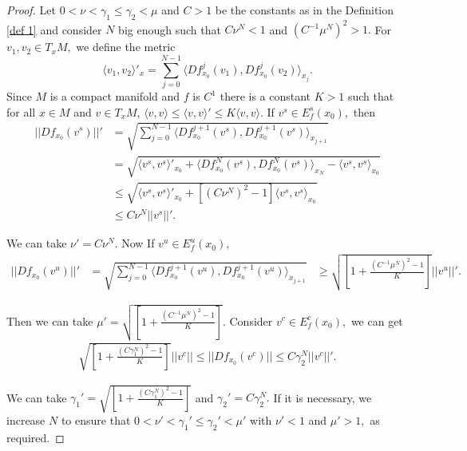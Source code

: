 \documentclass[12pt,reqno]{amsart}
\numberwithin{equation}{section}
\theoremstyle{plain}
\theoremstyle{remark}
\begin{document}
\begin{proof}
Let \mbox{$0<\nu<\gamma_1\leq \gamma_2<\mu$} and $C>1$ be the constants as in the Definition \ref{def 1} and consider $N$ big enough such that $C\nu^N< 1$ and $(C^{-1}\mu^N)^2>  1.$
For $v_1,v_2\in T_xM,$ we define the metric
$$
\langle v_1,v_2\rangle'_x=\displaystyle\sum_{j=0}^{N-1}\langle Df^j_{x_0}(v_1),Df^j_{x_0}(v_2)\rangle_{x_j}.
$$
Since $M$ is a compact manifold and $f$ is $C^1$ there is a
constant $K > 1$ such that for all $x\in M$ and $v\in T_xM$,  $\langle v,v\rangle\leq\langle v,v\rangle'\leq K\langle v,v\rangle.$ If $v^s\in E^s_f(x_0),$ then
\begin{align*}
||Df_{x_0}(v^s)||'&=\sqrt{\displaystyle\sum_{j=0}^{N-1}\langle Df^{j+1}_{x_{0}}(v^s),Df^{j+1}_{x_{0}}(v^s)\rangle_{x_{j+1}}}\\
&=\sqrt{\langle v^s,v^s\rangle'_{x_0}+\langle Df^N_{x_0}(v^s),Df^N_{x_0}(v^s)\rangle_{x_N}-\langle v^s,v^s\rangle_{x_0}}\\
&\leq\sqrt{\langle v^s,v^s\rangle'_{x_0}+[(C\nu^N)^2-1]\langle v^s,v^s\rangle_{x_0}}\\
&\leq C\nu^N ||v^s||'.
\end{align*}

We can take $\nu'= C\nu^N.$ Now  If $v^u\in E^u_f(x_0),$
\begin{align*}
||Df_{x_0}(v^u)||'&=\sqrt{\displaystyle\sum_{j=0}^{N-1}\langle Df^{j+1}_{x_{0}}(v^u),Df^{j+1}_{x_{0}}(v^u)\rangle_{x_{j+1}}} &\geq\sqrt{\left[1+\frac{(C^{-1}\mu^N)^2-1}{K}\right]}||v^u||'.
\end{align*}




Then we can take  $\mu'=\sqrt{\left[1+\frac{(C^{-1}\mu^N)^2-1}{K}\right]}.$ Consider $v^c\in E^c_f(x_0),$ we can get
\begin{align*}
\sqrt{\left[1+\frac{(C\gamma_1^N)^2-1}{K}\right]}||v^c|| \leq ||Df_{x_0}(v^c)||\leq C\gamma_2^N||v^c||'.
\end{align*}



We can take $\gamma_1'= \sqrt{\left[1+\frac{(C\gamma_1^N)^2-1}{K}\right]}$ and $\gamma_2'= C\gamma_2^N.$ If it is necessary, we increase $N$ to ensure that $0<\nu'<\gamma_1'\leq\gamma_2'<\mu'$ with $\nu'<1$ and $\mu'>1,$ as required.


\end{proof}
\end{document}
